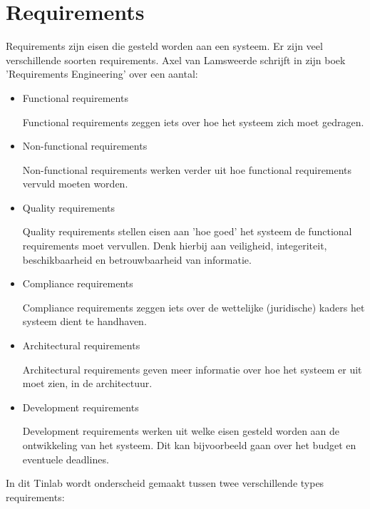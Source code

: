 \documentclass{article}
\begin{document}
	\newpage
	
	
	\section{Requirements}
	
	Requirements zijn eisen die gesteld worden aan een systeem. Er zijn veel verschillende soorten requirements. Axel van Lamsweerde schrijft in zijn boek 'Requirements Engineering' over een aantal: \cite{Lamsweerde2009Requirements}

	\begin{itemize}
		\item Functional requirements

			Functional requirements zeggen iets over hoe het systeem zich moet gedragen.

		\item Non-functional requirements

			Non-functional requirements werken verder uit hoe functional requirements vervuld moeten worden.

		\item Quality requirements

			Quality requirements stellen eisen aan 'hoe goed' het systeem de functional requirements moet vervullen. Denk hierbij aan veiligheid, integeriteit, beschikbaarheid en betrouwbaarheid van informatie. \par

		\item Compliance requirements
	
		Compliance requirements zeggen iets over de wettelijke (juridische) kaders het systeem dient te handhaven.

		\item Architectural requirements
	
		Architectural requirements geven meer informatie over hoe het systeem er uit moet zien, in de architectuur.

		\item Development requirements

		Development requirements werken uit welke eisen gesteld worden aan de ontwikkeling van het systeem. Dit kan bijvoorbeeld gaan over het budget en eventuele deadlines. \par

	\end{itemize} 
In dit Tinlab wordt onderscheid gemaakt tussen twee verschillende types requirements:
\end{document}
